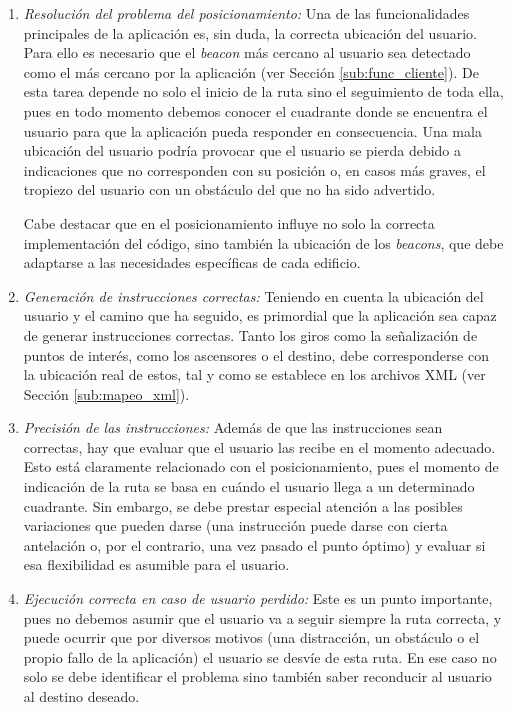 \begin{enumerate}
	
	\item \textit{Resolución del problema del posicionamiento:} Una de las funcionalidades principales de la aplicación es, sin duda, la correcta ubicación del usuario. Para ello es necesario que el \textit{beacon} más cercano al usuario sea detectado como el más cercano por la aplicación (ver Sección \ref{sub:func_cliente}). De esta tarea depende no solo el inicio de la ruta sino el seguimiento de toda ella, pues en todo momento debemos conocer el cuadrante donde se encuentra el usuario para que la aplicación pueda responder en consecuencia. Una mala ubicación del usuario podría provocar que el usuario se pierda debido a indicaciones que no corresponden con su posición o, en casos más graves, el tropiezo del usuario con un obstáculo del que no ha sido advertido.
	
	Cabe destacar que en el posicionamiento influye no solo la correcta implementación del código, sino también la ubicación de los \textit{beacons}, que debe adaptarse a las necesidades específicas de cada edificio. 
	
	\item \textit{Generación de instrucciones correctas:} Teniendo en cuenta la ubicación del usuario y el camino que ha seguido, es primordial que la aplicación sea capaz de generar instrucciones correctas. Tanto los giros como la señalización de puntos de interés, como los ascensores o el destino, debe corresponderse con la ubicación real de estos, tal y como se establece en los archivos XML (ver Sección \ref{sub:mapeo_xml}).
	
	\item \textit{Precisión de las instrucciones:} Además de que las instrucciones sean correctas, hay que evaluar que el usuario las recibe en el momento adecuado. Esto está claramente relacionado con el posicionamiento, pues el momento de indicación de la ruta se basa en cuándo el usuario llega a un determinado cuadrante. Sin embargo, se debe prestar especial atención a las posibles variaciones que pueden darse (una instrucción puede darse con cierta antelación o, por el contrario, una vez pasado el punto óptimo) y evaluar si esa flexibilidad es asumible para el usuario.
	
	\item \textit{Ejecución correcta en caso de usuario perdido:} Este es un punto importante, pues no debemos asumir que el usuario va a seguir siempre la ruta correcta, y puede ocurrir que por diversos motivos (una distracción, un obstáculo o el propio fallo de la aplicación) el usuario se desvíe de esta ruta. En ese caso no solo se debe identificar el problema sino también saber reconducir al usuario al destino deseado. 
		
\end{enumerate}


